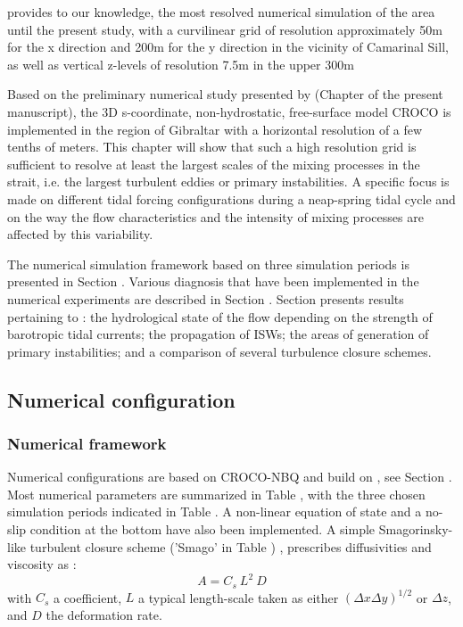 \citet{sanchez-garrido_2011} provides to our knowledge, the most resolved numerical simulation of the area until the present study, with a curvilinear grid of resolution approximately 50m for the x direction and 200m for the y direction in the vicinity of Camarinal Sill, as well as vertical z-levels of resolution 7.5m in the upper 300m

Based on the preliminary numerical study presented by \citet{hilt_2020} (Chapter  of the present manuscript), the 3D s-coordinate, non-hydrostatic, free-surface model CROCO is implemented in the region of Gibraltar with a horizontal resolution of a few tenths of meters. This chapter will show that such a high resolution grid is sufficient to resolve at least the largest scales of the mixing processes in the strait, i.e. the largest turbulent eddies or primary instabilities. A specific focus is made on different tidal forcing configurations during a neap-spring tidal cycle and on the way the flow characteristics and the intensity of mixing processes are affected by this variability. 

The numerical simulation framework based on three simulation periods is presented in Section . Various diagnosis that have been implemented in the numerical experiments are described in Section . Section  presents results pertaining to : the hydrological state of the flow depending on the strength of barotropic tidal currents; the propagation of ISWs; the areas of generation of primary instabilities; and a comparison of several turbulence closure schemes.

\subsection{Numerical configuration}
\label{section3Dnum}

\subsubsection{Numerical framework}

Numerical configurations are based on CROCO-NBQ and build on \citet{hilt_2020}, see Section . Most numerical parameters are summarized in Table , with the three chosen simulation periods indicated in Table . A non-linear equation of state and a no-slip condition at the bottom have also been implemented. A simple Smagorinsky-like turbulent closure scheme ('Smago' in Table ) \citep{smagorinsky_1963}, prescribes diffusivities and viscosity as :
\begin{equation}
    A = C_s \ L^2 \ D
\end{equation}
with $C_s$ a coefficient, $L$ a typical length-scale taken as either $(\Delta x \Delta y)^{1/2}$ or $\Delta z$, and $D$ the deformation rate.

